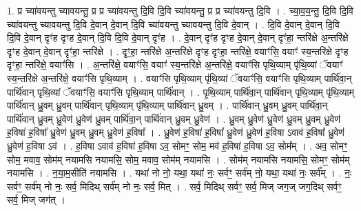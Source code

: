 \documentclass[17pt]{extarticle}
\begin{document}
1. प्र च्या॑वयन्तु च्यावयन्तु॒ प्र प्र च्या॑वयन्तु दि॒वि दि॒वि च्या॑वयन्तु॒ प्र प्र च्या॑वयन्तु दि॒वि । . च्या॒व॒य॒न्तु॒ दि॒वि दि॒वि च्या॑वयन्तु च्यावयन्तु दि॒वि दे॒वान् दे॒वान् दि॒वि च्या॑वयन्तु च्यावयन्तु दि॒वि दे॒वान् । . दि॒वि दे॒वान् दे॒वान् दि॒वि दि॒वि दे॒वान् दृꣳ॑ह दृꣳह दे॒वान् दि॒वि दि॒वि दे॒वान् दृꣳ॑ह । . दे॒वान् दृꣳ॑ह दृꣳह दे॒वान् दे॒वान् दृꣳ॑हा॒ न्तरि॑क्षे अ॒न्तरि॑क्षे दृꣳह दे॒वान् दे॒वान् दृꣳ॑हा॒ न्तरि॑क्षे । . दृꣳ॒॒हा॒ न्तरि॑क्षे अ॒न्तरि॑क्षे दृꣳह दृꣳहा॒ न्तरि॑क्षे॒ वयाꣳ॑सि॒ वयाꣳ॑ स्य॒न्तरि॑क्षे दृꣳह दृꣳहा॒ न्तरि॑क्षे॒ वयाꣳ॑सि । . अ॒न्तरि॑क्षे॒ वयाꣳ॑सि॒ वयाꣳ॑ स्य॒न्तरि॑क्षे अ॒न्तरि॑क्षे॒ वयाꣳ॑सि पृथि॒व्याम् पृ॑थि॒व्यां ॅवयाꣳ॑ स्य॒न्तरि॑क्षे अ॒न्तरि॑क्षे॒ वयाꣳ॑सि पृथि॒व्याम् । . वयाꣳ॑सि पृथि॒व्याम् पृ॑थि॒व्यां ॅवयाꣳ॑सि॒ वयाꣳ॑सि पृथि॒व्याम् पार्थि॑वा॒न् पार्थि॑वान् पृथि॒व्यां ॅवयाꣳ॑सि॒ वयाꣳ॑सि पृथि॒व्याम् पार्थि॑वान् । . पृ॒थि॒व्याम् पार्थि॑वा॒न् पार्थि॑वान् पृथि॒व्याम् पृ॑थि॒व्याम् पार्थि॑वान् ध्रु॒वम् ध्रु॒वम् पार्थि॑वान् पृथि॒व्याम् पृ॑थि॒व्याम् पार्थि॑वान् ध्रु॒वम् । . पार्थि॑वान् ध्रु॒वम् ध्रु॒वम् पार्थि॑वा॒न् पार्थि॑वान् ध्रु॒वम् ध्रु॒वेण॑ ध्रु॒वेण॑ ध्रु॒वम् पार्थि॑वा॒न् पार्थि॑वान् ध्रु॒वम् ध्रु॒वेण॑ । . ध्रु॒वम् ध्रु॒वेण॑ ध्रु॒वेण॑ ध्रु॒वम् ध्रु॒वम् ध्रु॒वेण॑ ह॒विषा॑ ह॒विषा᳚ ध्रु॒वेण॑ ध्रु॒वम् ध्रु॒वम् ध्रु॒वेण॑ ह॒विषा᳚ । . ध्रु॒वेण॑ ह॒विषा॑ ह॒विषा᳚ ध्रु॒वेण॑ ध्रु॒वेण॑ ह॒विषा ऽवाव॑ ह॒विषा᳚ ध्रु॒वेण॑ ध्रु॒वेण॑ ह॒विषा ऽव॑ । . ह॒विषा ऽवाव॑ ह॒विषा॑ ह॒विषा ऽव॒ सोमꣳ॒॒ सोम॒ मव॑ ह॒विषा॑ ह॒विषा ऽव॒ सोम᳚म् । . अव॒ सोमꣳ॒॒ सोम॒ मवाव॒ सोम॑म् नयामसि नयामसि॒ सोम॒ मवाव॒ सोम॑म् नयामसि । . सोम॑म् नयामसि नयामसि॒ सोमꣳ॒॒ सोम॑म् नयामसि । . न॒या॒म॒सीति॑ नयामसि । . यथा॑ नो नो॒ यथा॒ यथा॑ नः॒ सर्वꣳ॒॒ सर्व॑म् नो॒ यथा॒ यथा॑ नः॒ सर्व᳚म् । . नः॒ सर्वꣳ॒॒ सर्व॑म् नो नः॒ सर्व॒ मिदिथ् सर्व॑म् नो नः॒ सर्व॒ मित् । . सर्व॒ मिदिथ् सर्वꣳ॒॒ सर्व॒ मिज् जग॒ज् जग॒दिथ् सर्वꣳ॒॒ सर्व॒ मिज् जग॑त् । \newline
\end{document}
